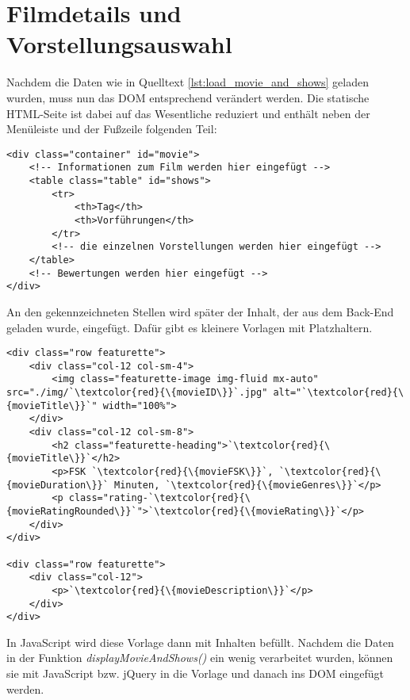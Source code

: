 \section{Filmdetails und Vorstellungsauswahl}

Nachdem die Daten wie in Quelltext \ref{lst:load_movie_and_shows} geladen wurden, muss nun das \acs{DOM} entsprechend verändert werden.
Die statische \acs{HTML}-Seite ist dabei auf das Wesentliche reduziert und enthält neben der Menüleiste und der Fußzeile folgenden Teil:

\begin{lstlisting}[style=lstHTML, caption={\acs{HTML}-Seite für Filmdetails}, label={lst:html_movie_and_shows}]
<div class="container" id="movie">
	<!-- Informationen zum Film werden hier eingefügt -->
	<table class="table" id="shows">
		<tr>
			<th>Tag</th>
			<th>Vorführungen</th>
		</tr>
		<!-- die einzelnen Vorstellungen werden hier eingefügt -->
	</table>
	<!-- Bewertungen werden hier eingefügt -->
</div>
\end{lstlisting}

An den gekennzeichneten Stellen wird später der Inhalt, der aus dem Back-End geladen wurde, eingefügt.
Dafür gibt es kleinere Vorlagen mit Platzhaltern.

\begin{lstlisting}[style=lstHTML, caption={\acs{HTML}-Vorlage mit Platzhaltern für Filmdetails}, label={lst:html_template_movie_detail}]
<div class="row featurette">
	<div class="col-12 col-sm-4">
		<img class="featurette-image img-fluid mx-auto" src="./img/`\textcolor{red}{\{movieID\}}`.jpg" alt="`\textcolor{red}{\{movieTitle\}}`" width="100%">
	</div>
	<div class="col-12 col-sm-8">
		<h2 class="featurette-heading">`\textcolor{red}{\{movieTitle\}}`</h2>
		<p>FSK `\textcolor{red}{\{movieFSK\}}`, `\textcolor{red}{\{movieDuration\}}` Minuten, `\textcolor{red}{\{movieGenres\}}`</p>
		<p class="rating-`\textcolor{red}{\{movieRatingRounded\}}`">`\textcolor{red}{\{movieRating\}}`</p>
	</div>
</div>

<div class="row featurette">
	<div class="col-12">
		<p>`\textcolor{red}{\{movieDescription\}}`</p>
	</div>
</div>
\end{lstlisting}


In JavaScript wird diese Vorlage dann mit Inhalten befüllt.
Nachdem die Daten in der Funktion \textit{displayMovieAndShows()} ein wenig verarbeitet wurden, können sie mit JavaScript bzw. jQuery in die Vorlage und danach ins \acs{DOM} eingefügt werden.

